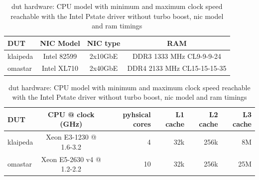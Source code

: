 \begin{table}[!ht]
	
	\vspace{3ex}
	\begin{tabular}[]{ l | c | c | c }
		DUT & NIC Model & NIC type & RAM \\ \hline
		klaipeda & Intel 82599 & 2x10GbE & DDR3 1333 MHz CL9-9-9-24 \\
		omastar & Intel XL710 & 2x40GbE & DDR4 2133 MHz CL15-15-15-35
	\end{tabular}

	\vspace{2ex}
	\begin{tabular}[]{ l | c | r | r | r | r }
		DUT & CPU @ clock (GHz) & pyhsical cores & L1 cache & L2 cache & L3 cache \\ \hline
		klaipeda & Xeon E3-1230 @ 1.6-3.2 & 4 & 32k & 256k & 8M \\ %
		omastar & Xeon E5-2630 v4 @ 1.2-2.2 & 10 & 32k & 256k & 25M %
	\end{tabular}

	\caption{\Ac{dut} hardware: CPU model with minimum and maximum clock speed reachable with the Intel Pstate driver without turbo boost, \Ac{nic} model and \Ac{ram} timings}
	\label{table:hardware}
\end{table}




